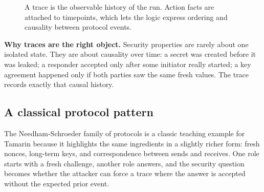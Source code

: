 \begin{figure}[ht]
  \centering
  \caption{A trace is the observable history of the run.  Action facts are
           attached to timepoints, which lets the logic express ordering and
           causality between protocol events.}
  \label{fig:tamarin-trace}
\end{figure}

\medskip\noindent
\textbf{Why traces are the right object.}  Security properties are rarely
about one isolated state.  They are about causality over time: a secret was
created before it was leaked; a responder accepted only after some initiator
really started; a key agreement happened only if both parties saw the same
fresh values.  The trace records exactly that causal history.

\subsection{A classical protocol pattern}

The Needham-Schroeder family of protocols is a classic teaching example for
Tamarin because it highlights the same ingredients in a slightly richer form:
fresh nonces, long-term keys, and correspondence between sends and receives.
One role starts with a fresh challenge, another role answers, and the
security question becomes whether the attacker can force a trace where the
answer is accepted without the expected prior event.

